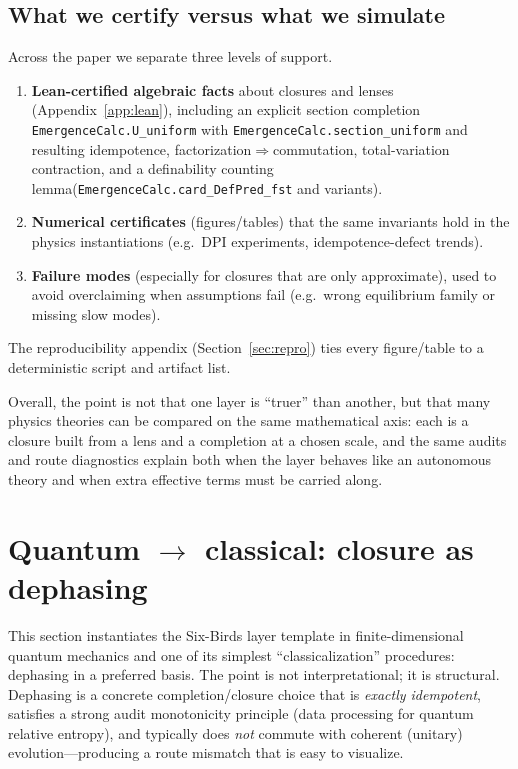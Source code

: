 \documentclass[11pt]{article}
\begin{document}
\subsection{What we certify versus what we simulate}
Across the paper we separate three levels of support.
\begin{enumerate}
  \item \textbf{Lean-certified algebraic facts} about closures and lenses (Appendix~\ref{app:lean}), including an explicit section completion {\small\texttt{EmergenceCalc.U\_uniform}} with {\small\texttt{EmergenceCalc.section\_uniform}} and resulting idempotence, factorization$\Rightarrow$\allowbreak commutation, total-variation contraction, and a definability counting lemma\linebreak ({\small\texttt{Emergence\allowbreak Calc.\allowbreak card\_\allowbreak DefPred\_fst}} and variants).

  \item \textbf{Numerical certificates} (figures/tables) that the same invariants hold in the physics instantiations (e.g.\ DPI experiments, idempotence-defect trends).

  \item \textbf{Failure modes} (especially for closures that are only approximate), used to avoid overclaiming when assumptions fail (e.g.\ wrong equilibrium family or missing slow modes).
\end{enumerate}
The reproducibility appendix (Section~\ref{sec:repro}) ties every figure/table to a deterministic script and artifact list.

\medskip
Overall, the point is not that one layer is ``truer'' than another, but that many physics theories can be compared on the same mathematical axis: each is a closure built from a lens and a completion at a chosen scale, and the same audits and route diagnostics explain both when the layer behaves like an autonomous theory and when extra effective terms must be carried along.
 \section{Quantum $\to$ classical: closure as dephasing}
\label{sec:quantum-classical}

This section instantiates the Six-Birds layer template in finite-dimensional quantum mechanics and one of its simplest ``classicalization'' procedures: dephasing in a preferred basis. The point is not interpretational; it is structural. Dephasing is a concrete completion/closure choice that is \emph{exactly idempotent}, satisfies a strong audit monotonicity principle (data processing for quantum relative entropy), and typically does \emph{not} commute with coherent (unitary) evolution---producing a route mismatch that is easy to visualize.
\end{document}
